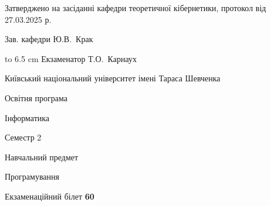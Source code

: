 \documentclass[12pt, ukrainian]{article}
\begin{document}
{\smallskip\smallskip \begin {scriptsize} Затверджено на засіданні кафедри теоретичної кібернетики, протокол   від   27.03.2025 р.\par\smallskip\smallskip\smallskip\smallskip
{\parbox {6.5 cm} {Зав. кафедри \dotfill Ю.В.~Крак}}\hspace {0.7cm} {\hbox to 6.5 cm { Екзаменатор \dotfill Т.О.~Карнаух}} \end{scriptsize}}
\newpage
{{\begin {scriptsize}\par
{ \center  Київський національний університет імені Тараса Шевченка \par}
{\parbox {5 cm}{Освітня програма \hfill}{\parbox {7 cm}{Інформатика\hfill}}\parbox {6 cm}{\hfill Семестр 2}}\par
{\parbox {5 cm} {Навчальний предмет \hfill}\parbox {7 cm}{Програмування \hfill}\parbox {6cm}{\hfill}\par}\vspace{-15pt} \end{scriptsize}}{\center Екзаменаційний білет \No \textbf { 60 }\par}}
\end{document}
